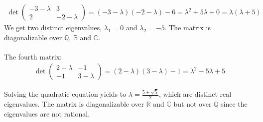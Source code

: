\documentclass{article}
\begin{document}
\begin{align*}
\det\begin{pmatrix}
-3 - \lambda & 3 \\
2 & -2 - \lambda
\end{pmatrix} = (-3 - \lambda)(-2 - \lambda) - 6 = \lambda^2 + 5\lambda + 0 = \lambda(\lambda + 5)
\end{align*}
We get two distinct eigenvalues, \(\lambda_1 = 0\) and \(\lambda_2 = -5\). The matrix is diagonalizable over \(\mathbb{Q}\), \(\mathbb{R}\) and \(\mathbb{C}\).
\\
\\
The fourth matrix:
\begin{align*}
\det\begin{pmatrix}
2 - \lambda & -1 \\
-1 & 3 - \lambda
\end{pmatrix} = (2 - \lambda)(3 - \lambda) - 1 = \lambda^2 - 5\lambda + 5
\end{align*}

Solving the quadratic equation yields to \(\lambda = \frac{5 \pm \sqrt{5}}{2}\), which are distinct real eigenvalues.
The matrix is diagonalizable over \(\mathbb{R}\) and \(\mathbb{C}\) but not over \(\mathbb{Q}\) since the eigenvalues are not rational.
\end{document}
